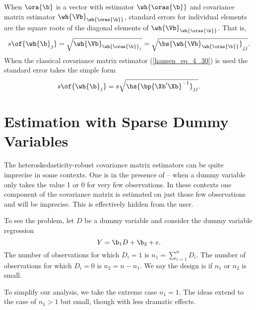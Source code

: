 When $\ora{\b}$ is a vector with estimator $\wh{\oras{\b}}$ and covariance matrix estimator $\wh{\Vb}_{\wh{\oras{\b}}}$, standard errors for individual elements are the square roots of the diagonal elements of $\wh{\Vb}_{\wh{\oras{\b}}}$. That is,
\begin{equation}
    \notag
    s\of{\wh{\b}_j} = \sqrt{\wh{\Vb}_{\wh{\oras{\b}}_j}} = \sqrt{\bs{\wh{\Vb}_{\wh{\oras{\b}}}}_{jj}}.
\end{equation}
When the classical covariance matrix estimator (\ref{hansen_eq_4_30}) is used the standard error takes the simple form
\begin{equation}
    \label{hansen_eq_4_37}
    s\of{\wh{\b}_j} = s \sqrt{\bs{\bp{\Xb^\prime \Xb}^{-1}}_{jj}}.
\end{equation}

\section{Estimation with Sparse Dummy Variables} \label{hansen_sec_4_18}
\setcounter{equation}{39}

The heteroskedasticity-robust covariance matrix estimators can be quite imprecise in some contexts. One is in the presence of  -- when a dummy variable only takes the value 1 or 0 for very few observations. In these contexts one component of the covariance matrix is estimated on just those few observations and will be imprecise. This is effectively hidden from the user.

To see the problem, let $D$ be a dummy variable and consider the dummy variable regression
\begin{equation}
    \label{hansen_eq_4_40}
    Y = \b_1 D + \b_2 + e.
\end{equation}
The number of observations for which $D_i = 1$ is $n_1 = \sum_{i=1}^n D_i$. The number of observations for which $D_i = 0$ is $n_2 = n - n_1$. We say the design is  if $n_1$ or $n_2$ is small.

To simplify our analysis, we take the extreme case $n_1 = 1$. The ideas extend to the case of $n_1 > 1$ but small, though with less dramatic effects.


